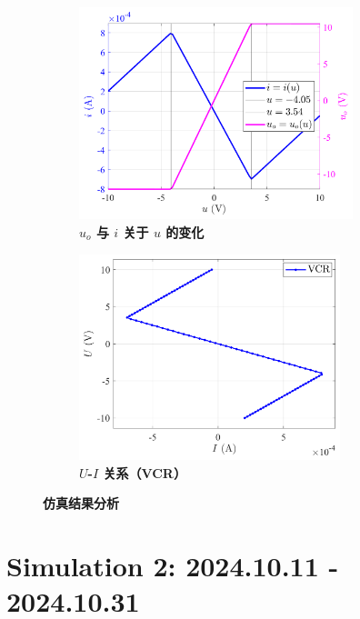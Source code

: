 \documentclass[UTF8]{report}
\theoremstyle{MyLineTheoremStyle} %
\theoremstyle{MyBlockTheoremStyle} %
\theoremstyle{MySubsubsectionStyle} %
\begin{document}
\begin{figure}[H]\centering
\begin{subfigure}[t]{0.52\textwidth}\centering
    \includegraphics[height=175pt]{assets/3/2024-09-13_01-13-08.png}
    \caption{\bfseries $u_o$ 与 $i$ 关于 $u$ 的变化}
\end{subfigure}\begin{subfigure}[t]{0.47\textwidth}\centering
    \includegraphics[height=170pt]{assets/3/2024-09-13_01-13-52.png}
    \caption{\bfseries $U$-$I$ 关系（VCR）}
\end{subfigure}
\caption{\bfseries 仿真结果分析 }\label{仿真结果分析}
\end{figure}








\captionsetup[figure]{name=Figure}  
\captionsetup[table]{name=Table}


\chapter{Simulation 2: 2024.10.11 - 2024.10.31}
\thispagestyle{fancy}
\end{document}
